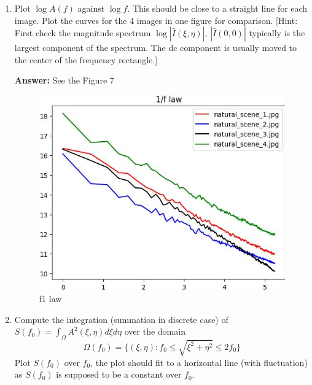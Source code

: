 \documentclass[11pt]{article}
\newcommand{\Answer}{\color{red}\textbf{Answer:} \color{black}}
\begin{document}
\begin{enumerate}

\item Plot $\log A(f)$ against $\log f$. This should be close to a straight line for each image. Plot the curves for the 4 images in one figure for comparison. [Hint: First check the magnitude spectrum $\log |\hat I(\xi, \eta)|$, $|\hat I(0, 0)|$ typically is the largest component of the spectrum. The dc component is usually moved to the center of the frequency rectangle.]

\Answer See the Figure 7
\begin{figure}[h]
    \centering
    \includegraphics[scale=0.5]{pro2_result/f1_law.jpg}
    \caption{f1 law}
\end{figure}


\item Compute the integration (summation in discrete case) of $S(f_0) = \int_{\Omega} A^2(\xi, \eta) d\xi d\eta$ over the domain
 \[ \Omega(f_0) =\{(\xi, \eta): f_0 \leq \sqrt{\xi^2 + \eta^2} \leq 2f_0 \} \]
Plot $S(f_0)$ over $f_0$, the plot should fit to a horizontal line (with fluctuation) as $S(f_0)$ is supposed to be a constant over $f_0$.


\end{enumerate}
\end{document}
